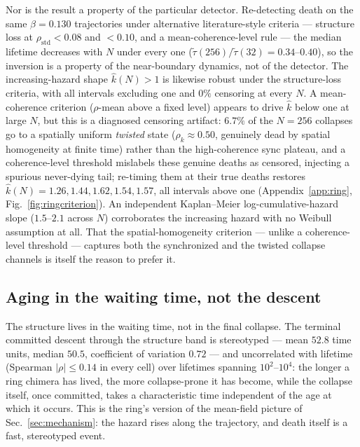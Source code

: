 \documentclass[pdflatex,sn-mathphys,Numbered]{sn-jnl}
\begin{document}
Nor is the result a property of the particular detector. Re-detecting death on
the same $\beta = 0.130$ trajectories under alternative literature-style
criteria --- structure loss at $\rho_{\mathrm{std}} < 0.08$ and $< 0.10$, and a
mean-coherence-level rule --- the median lifetime decreases with $N$ under every
one ($\tilde\tau(256)/\tilde\tau(32) = 0.34$--$0.40$), so the inversion is a
property of the near-boundary dynamics, not of the detector. The
increasing-hazard shape $\hat k(N) > 1$ is likewise robust under the
structure-loss criteria, with all intervals excluding one and $0\%$ censoring at
every $N$. A mean-coherence criterion ($\rho$-mean above a fixed level) appears
to drive $\hat k$ below one at large $N$, but this is a diagnosed censoring
artifact: $6.7\%$ of the $N = 256$ collapses go to a spatially uniform
\emph{twisted} state ($\rho_k \approx 0.50$, genuinely dead by spatial
homogeneity at finite time) rather than the high-coherence sync plateau, and a
coherence-level threshold mislabels these genuine deaths as censored, injecting
a spurious never-dying tail; re-timing them at their true deaths restores
$\hat k(N) = 1.26, 1.44, 1.62, 1.54, 1.57$, all intervals above one
(Appendix~\ref{app:ring}, Fig.~\ref{fig:ringcriterion}). An independent
Kaplan--Meier log-cumulative-hazard slope ($1.5$--$2.1$ across $N$) corroborates
the increasing hazard with no Weibull assumption at all. That the
spatial-homogeneity criterion --- unlike a coherence-level threshold ---
captures both the synchronized and the twisted collapse channels is itself the
reason to prefer it.

\subsection{Aging in the waiting time, not the descent}

The structure lives in the waiting time, not in the final collapse. The terminal
committed descent through the structure band is stereotyped --- mean $52.8$ time
units, median $50.5$, coefficient of variation $0.72$ --- and uncorrelated with
lifetime (Spearman $|\rho| \le 0.14$ in every cell) over lifetimes spanning
$10^2$--$10^4$: the longer a ring chimera has lived, the more collapse-prone it
has become, while the collapse itself, once committed, takes a characteristic
time independent of the age at which it occurs. This is the ring's version of
the mean-field picture of Sec.~\ref{sec:mechanism}: the hazard rises along the
trajectory, and death itself is a fast, stereotyped event.
\end{document}
